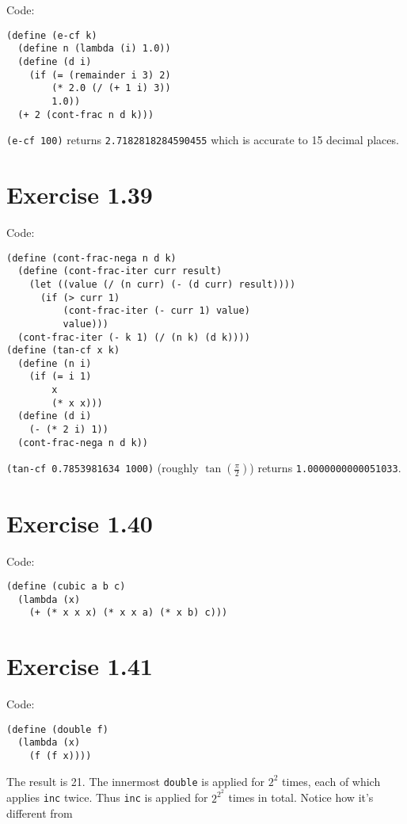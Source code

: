 \documentclass[../main.tex]{subfiles}
\begin{document}
Code:

\begin{lstlisting}
(define (e-cf k)
  (define n (lambda (i) 1.0))
  (define (d i)
    (if (= (remainder i 3) 2)
        (* 2.0 (/ (+ 1 i) 3))
        1.0))
  (+ 2 (cont-frac n d k)))
\end{lstlisting}

\lstinline{(e-cf 100)} returns \lstinline{2.7182818284590455} which is
 accurate to 15 decimal places.

\section{Exercise 1.39}

Code:

\begin{lstlisting}
(define (cont-frac-nega n d k)
  (define (cont-frac-iter curr result)
    (let ((value (/ (n curr) (- (d curr) result))))
      (if (> curr 1)
          (cont-frac-iter (- curr 1) value)
          value)))
  (cont-frac-iter (- k 1) (/ (n k) (d k))))
(define (tan-cf x k)
  (define (n i)
    (if (= i 1)
        x
        (* x x)))
  (define (d i)
    (- (* 2 i) 1))
  (cont-frac-nega n d k))
\end{lstlisting}

\lstinline{(tan-cf 0.7853981634 1000)} (roughly $\tan(\frac{\pi}{2})$)
 returns \lstinline{1.0000000000051033}.

\section{Exercise 1.40}

Code:

\begin{lstlisting}
(define (cubic a b c)
  (lambda (x)
    (+ (* x x x) (* x x a) (* x b) c)))
\end{lstlisting}

\section{Exercise 1.41}

Code:

\begin{lstlisting}
(define (double f)
  (lambda (x)
    (f (f x))))
\end{lstlisting}

The result is 21. The innermost \lstinline{double}
 is applied for $2^2$ times, each of which applies
 \lstinline{inc} twice. Thus \lstinline{inc} is applied
 for $2^{2^2}$ times in total. Notice how it's
 different from
\end{document}
